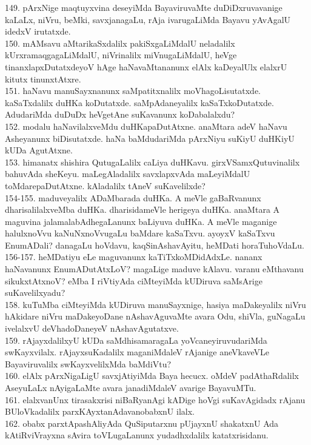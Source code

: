 \documentclass{article}
\begin{document}
149. pArxNige maqtuyxvina deseyiMda BayaviruvaMte duDiDxruvavanige kaLaLx, niVru, beMki, savxjanagaLu, rAja ivarugaLiMda Bayavu yAvAgalU idedxV irutatxde.\\
150. mAMsavu aMtarikaSxdalilx pakiSxgaLiMdalU neladalilx kUrxramaqgagaLiMdalU, niVrinalilx miVnugaLiMdalU, heVge tinanxlapxDutatxdeyoV hAge haNavaMtananunx elAlx kaDeyalUlx elalxrU kitutx tinunxtAtxre.\\
151. haNavu manuSayxnanunx saMpatitxnalilx moVhagoLisutatxde. kaSaTxdalilx duHKa koDutatxde. saMpAdaneyalilx kaSaTxkoDutatxde. AdudariMda duDuDx heVgetAne suKavanunx koDabalalxdu?\\
152. modalu haNavilalxveMdu duHKapaDutAtxne. anaMtara adeV haNavu Asheyanunx biDisutatxde. haNa baMdudariMda pArxNiyu suKiyU duHKiyU kUDa AgutAtxne.\\
153. himanatx shishira QutugaLalilx caLiya duHKavu. girxVSamxQutuvinalilx bahuvAda sheKeyu. maLegAladalilx savxlapxvAda maLeyiMdalU toMdarepaDutAtxne. kAladalilx tAneV suKavelilxde?\\
154-155. maduveyalilx ADaMbarada duHKa. A meVle gaBaRvanunx dharisalilalxveMba duHKa. dharisidameVle herigeya duHKa. anaMtara A maguvina jalamalabAdhegaLanunx baLiyuva duHKa. A meVle maganige halulxnoVvu kaNuNxnoVvugaLu baMdare kaSaTxvu. ayoyxV kaSaTxvu EnumADali? danagaLu hoVdavu, kaqSinAshavAyitu, heMDati horaTuhoVdaLu.\\
156-157. heMDatiyu eLe maguvanunx kaTiTxkoMDidAdxLe. nananx haNavanunx EnumADutAtxLoV? magaLige maduve kAlavu. varanu eMthavanu sikukxtAtxnoV? eMba I riVtiyAda ciMteyiMda kUDiruva saMsArige suKavelilxyadu?\\
158. kuTuMba ciMteyiMda kUDiruva manuSayxnige, hasiya maDakeyalilx niVru hAkidare niVru maDakeyoDane nAshavAguvaMte avara Odu, shiVla, guNagaLu ivelalxvU deVhadoDaneyeV nAshavAgutatxve.\\
159. rAjayxdalilxyU kUDa saMdhisamaragaLa yoVcaneyiruvudariMda swKayxvilalx. rAjayxsuKadalilx maganiMdaleV rAjanige aneVkaveVLe Bayaviruvalilx swKayxvelilxMda baMdiVtu?\\
160. elAlx pArxNigaLigU savxjAtiyiMda Baya hecucx. oMdeV padAthaRdalilx AseyuLaLx nAyigaLaMte avara janadiMdaleV avarige BayavuMTu.\\
161. elalxvanUnx tirasakxrisi niBaRyanAgi kADige hoVgi suKavAgidadx rAjanu BUloVkadalilx parxKAyxtanAdavanobabxnU ilalx.\\
162. obabx parxtApashAliyAda QuSiputarxnu pUjayxnU shakatxnU Ada kAtiRviVrayxna sAvira toVLugaLanunx yudadhxdalilx katatxrisidanu.\\
\end{document}
